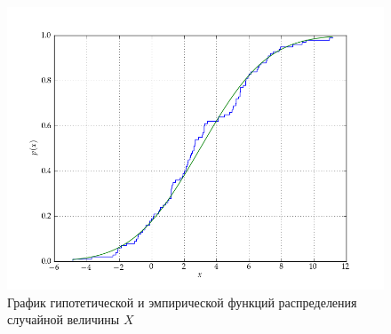 \documentclass[14pt,hidelinks]{extarticle}
\begin{document}
\newpage
\fancyhf{}
\begin{landscape}
  \begin{figure}[H]
    \centering
    \includegraphics[width=0.9\linewidth]{pic/sample_normal.png}
    \caption{График гипотетической и эмпирической функций распределения случайной величины $ X $\label{fig:sample_normal}}
  \end{figure}
\end{landscape}
\restoregeometry
\end{document}
